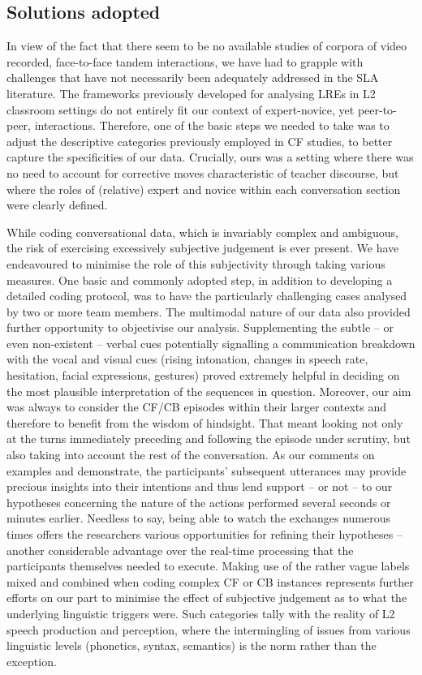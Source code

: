 \documentclass[output=paper,colorlinks,citecolor=brown,modfonts,nonflat]{../langscibook}
\begin{document}
\subsection{Solutions adopted}\label{sec:scheuer:6.2}

In view of the fact that there seem to be no available studies of corpora of video recorded, face-to-face tandem interactions, we have had to grapple with challenges that have not necessarily been adequately addressed in the SLA literature. The frameworks previously developed for analysing LREs in L2 classroom settings do not entirely fit our context of expert-novice, yet peer-to-peer, interactions. Therefore, one of the basic steps we needed to take was to adjust the descriptive categories previously employed in CF studies, to better capture the specificities of our data. Crucially, ours was a setting where there was no need to account for corrective moves characteristic of teacher discourse, but where the roles of (relative) expert and novice within each conversation section were clearly defined.

While coding conversational data, which is invariably complex and ambiguous, the risk of exercising excessively subjective judgement is ever present. We have endeavoured to minimise the role of this subjectivity through taking various measures. One basic and commonly adopted step, in addition to developing a detailed coding protocol, was to have the particularly challenging cases analysed by two or more team members. The multimodal nature of our data also provided further opportunity to objectivise our analysis. Supplementing the subtle – or even non-existent – verbal cues potentially signalling a communication breakdown with the vocal and visual cues (rising intonation, changes in speech rate, hesitation, facial expressions, gestures) proved extremely helpful in deciding on the most plausible interpretation of the sequences in question. Moreover, our aim was always to consider the CF/CB episodes within their larger contexts and therefore to benefit from the wisdom of hindsight. That meant looking not only at the turns immediately preceding and following the episode under scrutiny, but also taking into account the rest of the conversation. As our comments on examples  and  demonstrate, the participants’ subsequent utterances may provide precious insights into their intentions and thus lend support – or not – to our hypotheses concerning the nature of the actions performed several seconds or minutes earlier. Needless to say, being able to watch the exchanges numerous times offers the researchers various opportunities for refining their hypotheses – another considerable advantage over the real-time processing that the participants themselves needed to execute. Making use of the rather vague labels mixed and combined when coding complex CF or CB instances represents further efforts on our part to minimise the effect of subjective judgement as to what the underlying linguistic triggers were. Such categories tally with the reality of L2 speech production and perception, where the intermingling of issues from various linguistic levels (phonetics, syntax, semantics) is the norm rather than the exception. 
\end{document}
